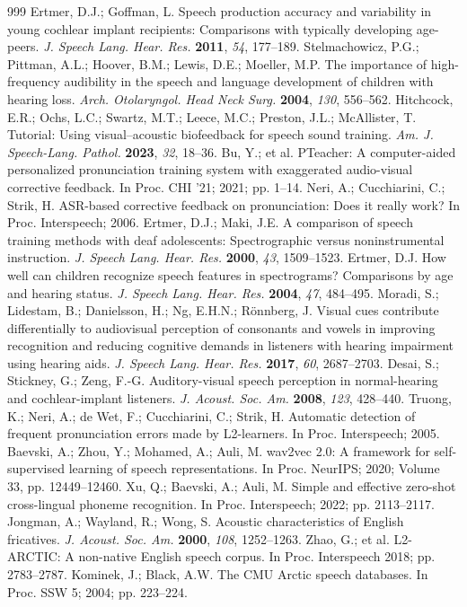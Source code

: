 \documentclass[engproc,article,submit,moreauthors]{Definitions/mdpi}
\begin{document}
\begin{thebibliography}{999}
 Ertmer, D.J.; Goffman, L. Speech production accuracy and variability in young cochlear implant recipients: Comparisons with typically developing age-peers. {\em J. Speech Lang. Hear. Res.} {\bf 2011}, {\em 54}, 177--189.
 Stelmachowicz, P.G.; Pittman, A.L.; Hoover, B.M.; Lewis, D.E.; Moeller, M.P. The importance of high-frequency audibility in the speech and language development of children with hearing loss. {\em Arch. Otolaryngol. Head Neck Surg.} {\bf 2004}, {\em 130}, 556--562.
 Hitchcock, E.R.; Ochs, L.C.; Swartz, M.T.; Leece, M.C.; Preston, J.L.; McAllister, T. Tutorial: Using visual--acoustic biofeedback for speech sound training. {\em Am. J. Speech-Lang. Pathol.} {\bf 2023}, {\em 32}, 18--36.
 Bu, Y.; et al. PTeacher: A computer-aided personalized pronunciation training system with exaggerated audio-visual corrective feedback. In Proc. CHI '21; 2021; pp. 1--14.
 Neri, A.; Cucchiarini, C.; Strik, H. ASR-based corrective feedback on pronunciation: Does it really work? In Proc. Interspeech; 2006.
 Ertmer, D.J.; Maki, J.E. A comparison of speech training methods with deaf adolescents: Spectrographic versus noninstrumental instruction. {\em J. Speech Lang. Hear. Res.} {\bf 2000}, {\em 43}, 1509--1523.
 Ertmer, D.J. How well can children recognize speech features in spectrograms? Comparisons by age and hearing status. {\em J. Speech Lang. Hear. Res.} {\bf 2004}, {\em 47}, 484--495.
 Moradi, S.; Lidestam, B.; Danielsson, H.; Ng, E.H.N.; R{\"o}nnberg, J. Visual cues contribute differentially to audiovisual perception of consonants and vowels in improving recognition and reducing cognitive demands in listeners with hearing impairment using hearing aids. {\em J. Speech Lang. Hear. Res.} {\bf 2017}, {\em 60}, 2687--2703.
 Desai, S.; Stickney, G.; Zeng, F.-G. Auditory-visual speech perception in normal-hearing and cochlear-implant listeners. {\em J. Acoust. Soc. Am.} {\bf 2008}, {\em 123}, 428--440.
 Truong, K.; Neri, A.; de Wet, F.; Cucchiarini, C.; Strik, H. Automatic detection of frequent pronunciation errors made by L2-learners. In Proc. Interspeech; 2005.
 Baevski, A.; Zhou, Y.; Mohamed, A.; Auli, M. wav2vec 2.0: A framework for self-supervised learning of speech representations. In Proc. NeurIPS; 2020; Volume 33, pp. 12449--12460.
 Xu, Q.; Baevski, A.; Auli, M. Simple and effective zero-shot cross-lingual phoneme recognition. In Proc. Interspeech; 2022; pp. 2113--2117.
 Jongman, A.; Wayland, R.; Wong, S. Acoustic characteristics of English fricatives. {\em J. Acoust. Soc. Am.} {\bf 2000}, {\em 108}, 1252--1263.
 Zhao, G.; et al. L2-ARCTIC: A non-native English speech corpus. In Proc. Interspeech 2018; pp. 2783--2787.
 Kominek, J.; Black, A.W. The CMU Arctic speech databases. In Proc. SSW 5; 2004; pp. 223--224.
\end{thebibliography}
\end{document}
